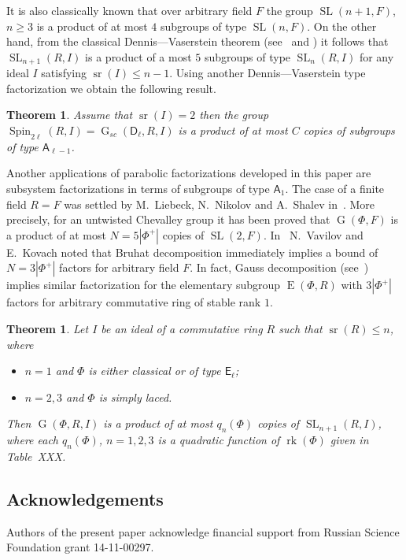 \documentclass[12pt]{amsart}
\numberwithin{equation}{section}
\newcounter{thmcounter} \newcounter{lemmacounter}
\newtheorem{thm}[thmcounter]{Theorem}
\theoremstyle{definition}
\DeclareMathOperator{\G}{G}
\DeclareMathOperator{\SL}{SL}
\DeclareMathOperator{\E}{E}
\DeclareMathOperator{\sr}{sr}
\DeclareMathOperator{\Spin}{Spin}
\DeclareMathOperator{\rk}{rk}
\newcommand{\rA}{\mathsf{A}}
\newcommand{\rD}{\mathsf{D}}
\newcommand{\rE}{\mathsf{E}}
\begin{document}
It is also classically known that over arbitrary field $F$ the group $\SL(n+1, F)$, $n\geq 3$ is a product of at most $4$ subgroups of type $\SL(n, F)$.
On the other hand, from the classical Dennis---Vaserstein theorem (see~\cite{Va69} and \cite[Lemma~2.1]{ST76})
it follows that $\SL_{n+1}(R, I)$ is a product of a most $5$ subgroups of type $\SL_n(R, I)$ for any ideal $I$ satisfying $\sr(I)\leq n-1$.
Using another Dennis---Vaserstein type factorization we obtain the following result.
\begin{thm} Assume that $\sr(I) = 2$ then the group $\Spin_{2\ell}(R, I)=\G_{sc}(\rD_\ell, R, I)$ is a product of at most $C$ copies of subgroups of type $\rA_{\ell-1}$. \end{thm}

Another applications of parabolic factorizations developed in this paper are subsystem factorizations in terms of subgroups of type $\rA_1$.
The case of a finite field $R=F$ was settled by M.~Liebeck, N.~Nikolov and A.~Shalev in~\cite{NikProdDecomp}.
More precisely, for an untwisted Chevalley group it has been proved that $\G(\Phi, F)$ is a product of at most $N=5|\Phi^+|$ copies of $\SL(2, F)$.
In~\cite{VavKovSL2} N.~Vavilov and E.~Kovach noted that Bruhat decomposition immediately implies a bound of $N=3|\Phi^+|$ factors for arbitrary field $F$.
In fact, Gauss decomposition (see~\cite{Sm12}) implies similar factorization for the elementary subgroup $\E(\Phi, R)$ with $3|\Phi^+|$ factors for arbitrary commutative ring of stable rank $1$.

\begin{thm} Let $I$ be an ideal of a commutative ring $R$ such that $\sr(R)\leq n$, where
\begin{itemize}
 \item $n=1$ and $\Phi$ is either classical or of type $\rE_\ell$;
 \item $n=2, 3$ and $\Phi$ is simply laced.
\end{itemize}
Then $\G(\Phi, R, I)$ is a product of at most $q_{n}(\Phi)$ copies of $\SL_{n+1}(R, I)$, where each $q_{n}(\Phi)$, $n=1,2,3$ is a quadratic function of $\rk(\Phi)$ given in Table~XXX.
\end{thm}


\subsection{Acknowledgements}
Authors of the present paper acknowledge financial support from Russian Science Foundation grant 14-11-00297.
\end{document}
